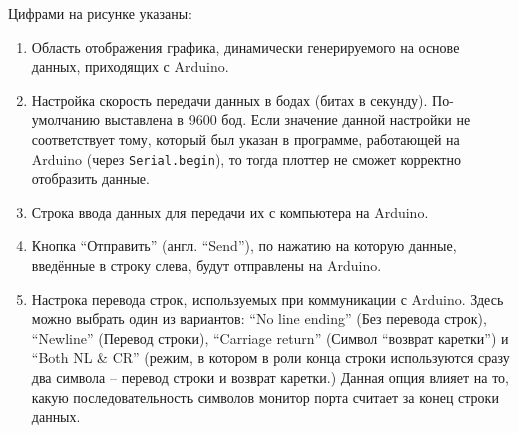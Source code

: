 \documentclass[../sparc.tex]{subfiles}
\begin{document}
Цифрами на рисунке указаны:

\begin{enumerate}
\item Область отображения графика, динамически генерируемого на основе данных,
  приходящих с Arduino.
\item Настройка скорость передачи данных в бодах (битах в секунду).
  По-умолчанию выставлена в 9600 бод.  Если значение данной настройки не
  соответствует тому, который был указан в программе, работающей на Arduino
  (через \texttt{Serial.begin}), то тогда плоттер не сможет корректно отобразить
  данные.
\item Строка ввода данных для передачи их с компьютера на Arduino.
\item Кнопка ``Отправить'' (англ. ``Send''), по нажатию на которую данные,
  введённые в строку слева, будут отправлены на Arduino.
\item Настрока перевода строк, используемых при коммуникации с Arduino.  Здесь
  можно выбрать один из вариантов: ``No line ending'' (Без перевода строк),
  ``Newline'' (Перевод строки), ``Carriage return'' (Символ ``возврат каретки'')
  и ``Both NL & CR'' (режим, в котором в роли конца строки используются сразу
  два символа -- перевод строки и возврат каретки.)  Данная опция влияет на то,
  какую последовательность символов монитор порта считает за конец строки
  данных.
\end{enumerate}
\end{document}

